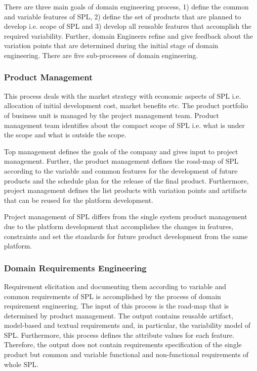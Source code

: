 There are three main goals of domain engineering process, 1) define the common and variable features of SPL, 2) define the set of products that are planned to develop i.e. scope of SPL and 3) develop all reusable features that accomplish the required variability. Further, domain Engineers refine and give feedback about the variation points that are determined during the initial stage of domain engineering. There are five sub-processes of domain engineering.

\subsubsection{Product Management}

This process deals with the market strategy with economic aspects of SPL i.e. allocation of initial development cost, market benefits etc. The product portfolio of business unit is managed by the project management team. Product management team identifies about the compact scope of SPL i.e. what is under the scope and what is outside the scope. 

Top management defines the goals of the company and gives input to project management. Further, the product management defines the road-map of SPL according to the variable and common features for the development of future products and the schedule plan for the release of the final product. Furthermore, project management defines the list products with variation points and artifacts that can be reused for the platform development.

Project management of SPL differs from the single system product management due to the platform development that accomplishes the changes in features, constraints and set the standards for future product development from the same platform. 

\subsubsection{Domain Requirements Engineering}

Requirement elicitation and documenting them according to variable and common requirements of SPL is accomplished by the process of domain requirement engineering. The input of this process is the road-map that is determined by product management. The output contains reusable artifact, model-based and textual requirements and, in particular, the variability model of SPL. Furthermore, this process defines the attribute values for each feature. Therefore, the output does not contain requirements specification of the single product but common and variable functional and non-functional requirements of whole SPL.


